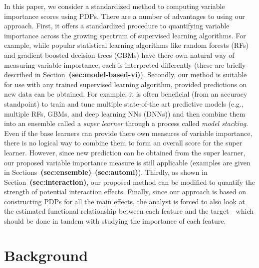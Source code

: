 \documentclass[12pt]{article}
\def\ref#1{\textbf{(#1)}}
\begin{document}

In this paper, we consider a standardized method to computing variable importance scores using PDPs. There are a number of advantages to using our approach. First, it offers a standardized procedure to quantifying variable importance across the growing spectrum of supervised learning algorithms. For example, while popular statistical learning algorithms like random forests (RFs) and gradient boosted decision trees (GBMs) have there own natural way of measuring variable importance, each is interpreted differently (these are briefly described in Section~\ref{sec:model-based-vi}). Secondly, our method is suitable for use with any trained supervised learning algorithm, provided predictions on new data can be obtained. For example, it is often beneficial (from an accuracy standpoint) to train and tune multiple state-of-the art predictive models (e.g., multiple RFs, GBMs, and deep learning NNs (DNNs)) and then combine them into an ensemble called a \textit{super learner} through a process called \textit{model stacking}. Even if the base learners can provide there own measures of variable importance, there is no logical way to combine them to form an overall score for the super learner. However, since new prediction can be obtained from the super learner, our proposed variable importance measure is still applicable (examples are given in Sections~\ref{sec:ensemble}--\ref{sec:automl}). Thirdly, as shown in Section~\ref{sec:interaction}, our proposed method can be modified to quantify the strength of potential interaction effects. Finally, since our approach is based on constructing PDPs for all the main effects, the analyst is forced to also look at the estimated functional relationship between each feature and the target---which should be done in tandem with studying the importance of each feature.


\section{Background}
\label{sec:background}
\end{document}
